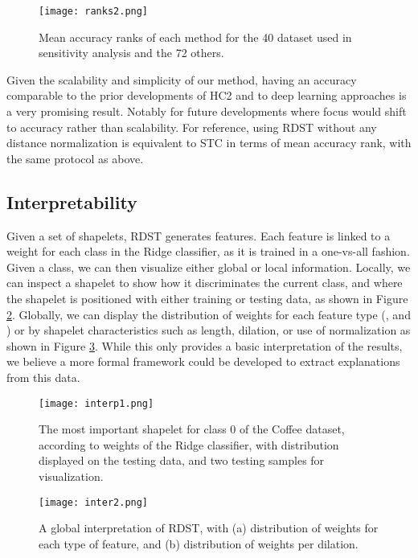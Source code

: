 \begin{figure}[h]
  \texttt{[image: ranks2.png]}
  \centering
  \caption{Mean accuracy ranks of each method for the 40 dataset used in sensitivity analysis and the 72 others.}
  \label{fig:ranksdiv}
\end{figure}

Given the scalability and simplicity of our method, having an accuracy comparable to the prior developments of HC2 and to deep learning approaches is a very promising result. Notably for future developments where focus would shift to accuracy rather than scalability. For reference, using RDST without any distance normalization is equivalent to STC in terms of mean accuracy rank, with the same protocol as above.

\subsection{Interpretability}
Given a set of  shapelets, RDST generates  features. Each feature is linked to a weight for each class in the Ridge classifier, as it is trained in a one-vs-all fashion. 
Given a class, we can then visualize either global or local information. Locally, we can inspect a shapelet to show how it discriminates the current class, and where the shapelet is positioned with either training or testing data, as shown in Figure \ref{fig:interp}. Globally, we can display the distribution of weights for each feature type (,  and ) or by shapelet characteristics such as length, dilation, or use of normalization as shown in Figure \ref{fig:interp2}. 
While this only provides a basic interpretation of the results, we believe a more formal framework could be developed to extract explanations from this data.
\begin{figure}[h!]
  \texttt{[image: interp1.png]}
  \centering
  \caption{The most important shapelet for class 0 of the Coffee dataset, according to weights of the Ridge classifier, with distribution displayed on the testing data, and two testing samples for visualization.}
  \label{fig:interp}
\end{figure}
\begin{figure}[h!]
  \texttt{[image: inter2.png]}
  \centering
  \caption{A global interpretation of RDST, with (a) distribution of weights for each type of feature, and (b) distribution of weights per dilation.}
  \label{fig:interp2}
\end{figure}
